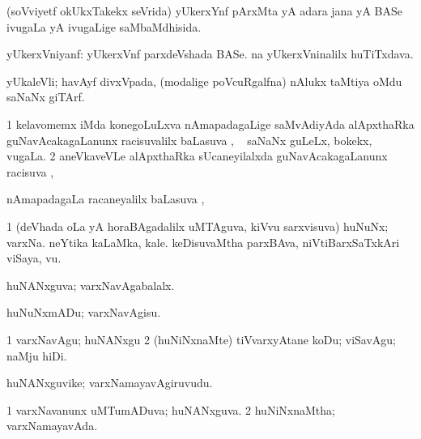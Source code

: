 \bentry
{} 
\gl{\gu}
\expl{}
\bmng
(soVviyetf okUkxTakekx seVrida) yUkerxYnf pArxMta yA adara jana yA BASe ivugaLa yA ivugaLige saMbaMdhisida. 
\emng
\eentry

\bentry
{} 
\gl{\nA}
\expl{}
\bmng
\banum
{} yUkerxVniyanf: yUkerxVnf parxdeVshada BASe. 
  na yUkerxVninalilx huTiTxdava. 
\eanum
\emng
\eentry

\bentry
{} 
\gl{\nA}
\expl{}
\bmng
yUkaleVli; havAyf divxVpada, (modalige poVcuRgalfna) nAlukx taMtiya oMdu saNaNx giTArf.  
\emng
\eentry

\bentry
{} 
\gl{\uparx}
\expl{}
\bmng
\bnum
\num{1} kelavomemx  iMda konegoLuLxva nAmapadagaLige saMvAdiyAda alApxthaRka guNavAcakagaLanunx racisuvalilx baLasuva \uparx, \udA\  saNaNx guLeLx, bokekx, \mo vugaLa. 
\num{2} aneVkaveVLe alApxthaRka sUcaneyilalxda guNavAcakagaLanunx racisuva \uparx, \udA\  
\enum
\emng
\eentry

\bentry
{}
\gl{\uparx}
\expl{}
\bmng
nAmapadagaLa racaneyalilx baLasuva \uparx, \udA\  
\emng
\eentry

\bentry
{} 
\gl{\nA}
\expl{}
\bmng
\bnum
\num{1} (deVhada oLa yA horaBAgadalilx uMTAguva, kiVvu sarxvisuva) huNuNx; varxNa. 
\banum
{} neYtika kaLaMka, kale. 
 keDisuvaMtha parxBAva, niVtiBarxSaTxkAri viSaya, \mo vu. 
\eanum
\numie
\enum
\emng
\eentry

\bentry
{} 
\gl{\gu}
\expl{}
\bmng
huNANxguva; varxNavAgabalalx. 
\emng
\eentry

\bentry
{} 
\gl{\sakirx}
\expl{}
\bmng
huNuNxmADu; varxNavAgisu. 
\emng

\noindent
\gl{\akirx}
\expl{}
\bmng
\bnum
\num{1} varxNavAgu; huNANxgu 
\num{2} (huNiNxnaMte) tiVvarxyAtane koDu; viSavAgu; naMju hiDi. 
\enum
\emng
\eentry

\bentry
{} 
\gl{\nA}
\expl{}
\bmng
huNANxguvike; varxNamayavAgiruvudu. 
\emng
\eentry

\bentry
{} 
\gl{\gu}
\expl{}
\bmng
\bnum
\num{1} varxNavanunx uMTumADuva; huNANxguva. 
\num{2} huNiNxnaMtha; varxNamayavAda. 
\enum
\emng
\eentry


